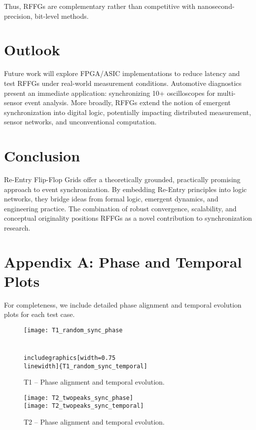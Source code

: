 \documentclass[11pt]{article}
\begin{document}
Thus, RFFGs are complementary rather than competitive with nanosecond-precision, bit-level methods.

\section{Outlook}
Future work will explore FPGA/ASIC implementations to reduce latency and test RFFGs under real-world measurement conditions. Automotive diagnostics present an immediate application: synchronizing 10+ oscilloscopes for multi-sensor event analysis. More broadly, RFFGs extend the notion of emergent synchronization into digital logic, potentially impacting distributed measurement, sensor networks, and unconventional computation.

\section{Conclusion}
Re-Entry Flip-Flop Grids offer a theoretically grounded, practically promising approach to event synchronization. By embedding Re-Entry principles into logic networks, they bridge ideas from formal logic, emergent dynamics, and engineering practice. The combination of robust convergence, scalability, and conceptual originality positions RFFGs as a novel contribution to synchronization research.

\appendix
\section*{Appendix A: Phase and Temporal Plots}

For completeness, we include detailed phase alignment and temporal evolution plots for each test case.

\begin{figure}[htbp!]
  \centering
  \texttt{[image: T1\_random\_sync\_phase\\\\[4pt]
  \\includegraphics[width=0.75\\linewidth]\{T1\_random\_sync\_temporal]}
  \caption{T1 -- Phase alignment and temporal evolution.}
\end{figure}

\begin{figure}[htbp!]
  \centering
  \texttt{[image: T2\_twopeaks\_sync\_phase]}\\[4pt]
  \texttt{[image: T2\_twopeaks\_sync\_temporal]}
  \caption{T2 -- Phase alignment and temporal evolution.}
\end{figure}
\end{document}
